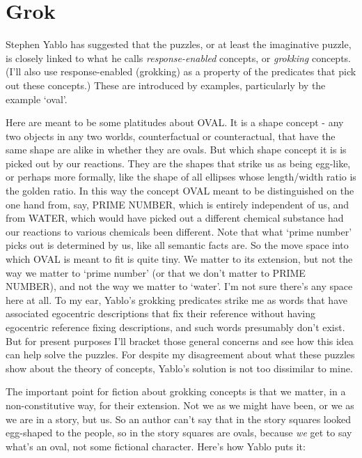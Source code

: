 \documentclass[
  11pt,
  letterpaper,
  DIV=11,
  numbers=noendperiod,
  twoside]{scrartcl}
\begin{document}
\section{Grok}\label{grok}

Stephen Yablo has suggested that the puzzles, or at least the
imaginative puzzle, is closely linked to what he calls
\emph{response-enabled} concepts, or \emph{grokking} concepts. (I'll
also use response-enabled (grokking) as a property of the predicates
that pick out these concepts.) These are introduced by examples,
particularly by the example `oval'.

Here are meant to be some platitudes about OVAL. It is a shape concept -
any two objects in any two worlds, counterfactual or counteractual, that
have the same shape are alike in whether they are ovals. But which shape
concept it is is picked out by our reactions. They are the shapes that
strike us as being egg-like, or perhaps more formally, like the shape of
all ellipses whose length/width ratio is the golden ratio. In this way
the concept OVAL meant to be distinguished on the one hand from, say,
PRIME NUMBER, which is entirely independent of us, and from WATER, which
would have picked out a different chemical substance had our reactions
to various chemicals been different. Note that what `prime number' picks
out is determined by us, like all semantic facts are. So the move space
into which OVAL is meant to fit is quite tiny. We matter to its
extension, but not the way we matter to `prime number' (or that we don't
matter to PRIME NUMBER), and not the way we matter to `water'. I'm not
sure there's any space here at all. To my ear, Yablo's grokking
predicates strike me as words that have associated egocentric
descriptions that fix their reference without having egocentric
reference fixing descriptions, and such words presumably don't exist.
But for present purposes I'll bracket those general concerns and see how
this idea can help solve the puzzles. For despite my disagreement about
what these puzzles show about the theory of concepts, Yablo's solution
is not too dissimilar to mine.

The important point for fiction about grokking concepts is that we
matter, in a non-constitutive way, for their extension. Not we as we
might have been, or we as we are in a story, but us. So an author can't
say that in the story squares looked egg-shaped to the people, so in the
story squares are ovals, because \emph{we} get to say what's an oval,
not some fictional character. Here's how Yablo puts it:
\end{document}
